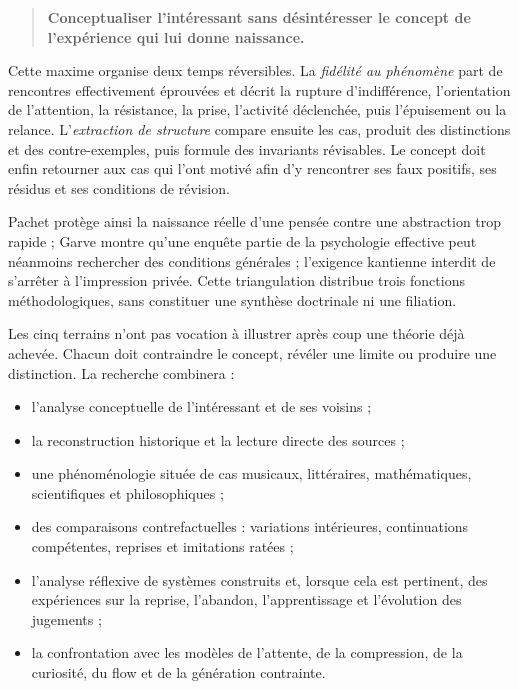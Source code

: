 \documentclass[11pt,a4paper]{article}
\begin{document}
\begin{quote}
\textbf{Conceptualiser l'intéressant sans désintéresser le concept de
l'expérience qui lui donne naissance.}
\end{quote}

Cette maxime organise deux temps réversibles. La \emph{fidélité au phénomène}
part de rencontres effectivement éprouvées et décrit la rupture d'indifférence,
l'orientation de l'attention, la résistance, la prise, l'activité déclenchée,
puis l'épuisement ou la relance. L'\emph{extraction de structure} compare ensuite
les cas, produit des distinctions et des contre-exemples, puis formule des
invariants révisables. Le concept doit enfin retourner aux cas qui l'ont motivé
afin d'y rencontrer ses faux positifs, ses résidus et ses conditions de révision.

Pachet protège ainsi la naissance réelle d'une pensée contre une abstraction trop
rapide ; Garve montre qu'une enquête partie de la psychologie effective peut
néanmoins rechercher des conditions générales ; l'exigence kantienne interdit de
s'arrêter à l'impression privée. Cette triangulation distribue trois fonctions
méthodologiques, sans constituer une synthèse doctrinale ni une filiation.

Les cinq terrains n'ont pas vocation à illustrer après coup une théorie déjà
achevée. Chacun doit contraindre le concept, révéler une limite ou produire une
distinction. La recherche combinera :

\begin{itemize}
  \item l'analyse conceptuelle de l'intéressant et de ses voisins ;
  \item la reconstruction historique et la lecture directe des sources ;
  \item une phénoménologie située de cas musicaux, littéraires, mathématiques,
        scientifiques et philosophiques ;
  \item des comparaisons contrefactuelles : variations intérieures,
        continuations compétentes, reprises et imitations ratées ;
  \item l'analyse réflexive de systèmes construits et, lorsque cela est
        pertinent, des expériences sur la reprise, l'abandon, l'apprentissage
        et l'évolution des jugements ;
  \item la confrontation avec les modèles de l'attente, de la compression, de
        la curiosité, du flow et de la génération contrainte.
\end{itemize}
\end{document}
